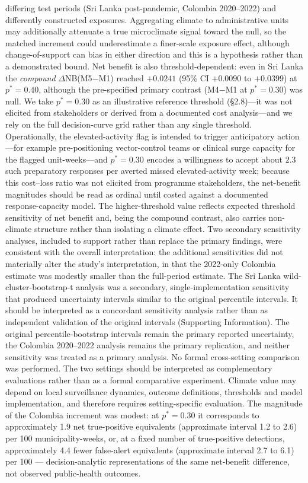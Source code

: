 \documentclass[11pt,a4paper]{article}
\begin{document}
differing test periods (Sri Lanka post-pandemic, Colombia 2020--2022) and differently constructed exposures. Aggregating climate to administrative units may additionally attenuate a true microclimate signal toward the null, so the matched increment could underestimate a finer-scale exposure effect, although change-of-support can bias in either direction and this is a hypothesis rather than a demonstrated bound. Net benefit is also threshold-dependent: even in Sri Lanka the \emph{compound} $\Delta$NB(M5$-$M1) reached $+0.0241$ (95\% CI $+0.0090$ to $+0.0399$) at $p^*=0.40$, although the pre-specified primary contrast (M4$-$M1 at $p^*=0.30$) was null. We take $p^*=0.30$ as an illustrative reference threshold (\S2.8)---it was not elicited from stakeholders or derived from a documented cost analysis---and we rely on the full decision-curve grid rather than any single threshold. Operationally, the elevated-activity flag is intended to trigger anticipatory action---for example pre-positioning vector-control teams or clinical surge capacity for the flagged unit-weeks---and $p^*=0.30$ encodes a willingness to accept about $2.3$ such preparatory responses per averted missed elevated-activity week; because this cost--loss ratio was not elicited from programme stakeholders, the net-benefit magnitudes should be read as ordinal until costed against a documented response-capacity model. The higher-threshold value reflects expected threshold sensitivity of net benefit and, being the compound contrast, also carries non-climate structure rather than isolating a climate effect. Two secondary sensitivity analyses, included to support rather than replace the primary findings, were consistent with the overall interpretation: the additional sensitivities did not materially alter the study's interpretation, in that the 2022-only Colombia estimate was modestly smaller than the full-period estimate. The Sri Lanka wild-cluster-bootstrap-t analysis was a secondary, single-implementation sensitivity that produced uncertainty intervals similar to the original percentile intervals. It should be interpreted as a concordant sensitivity analysis rather than as independent validation of the original intervals (Supporting Information). The original percentile-bootstrap intervals remain the primary reported uncertainty, the Colombia 2020--2022 analysis remains the primary replication, and neither sensitivity was treated as a primary analysis. No formal cross-setting comparison was performed. The two settings should be interpreted as complementary evaluations rather than as a formal comparative experiment. Climate value may depend on local surveillance dynamics, outcome definitions, thresholds and model implementation, and therefore requires setting-specific evaluation. The magnitude of the Colombia increment was modest: at $p^*=0.30$ it corresponds to approximately 1.9 net true-positive equivalents (approximate interval 1.2 to 2.6) per 100 municipality-weeks, or, at a fixed number of true-positive detections, approximately 4.4 fewer false-alert equivalents (approximate interval 2.7 to 6.1) per 100 --- decision-analytic representations of the same net-benefit difference, not observed public-health outcomes.
\end{document}
